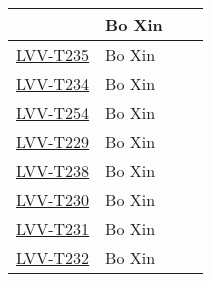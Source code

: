 \documentclass[SE,lsstdraft,STR,toc]{lsstdoc}
\begin{document}
\begin{longtable}{p{3cm}p{3cm}p{3cm}p{6cm}}
& {\small Bo Xin } & {\small  } &
\begin{minipage}[]{6cm}
\smallskip
{\small  }
\medskip
\end{minipage}
\\ \hline
\href{https://jira.lsstcorp.org/secure/Tests.jspa#/testCase/LVV-T235}{LVV-T235}
& {\small Bo Xin } & {\small  } &
\begin{minipage}[]{6cm}
\smallskip
{\small  }
\medskip
\end{minipage}
\\ \hline
\href{https://jira.lsstcorp.org/secure/Tests.jspa#/testCase/LVV-T234}{LVV-T234}
& {\small Bo Xin } & {\small  } &
\begin{minipage}[]{6cm}
\smallskip
{\small  }
\medskip
\end{minipage}
\\ \hline
\href{https://jira.lsstcorp.org/secure/Tests.jspa#/testCase/LVV-T254}{LVV-T254}
& {\small Bo Xin } & {\small  } &
\begin{minipage}[]{6cm}
\smallskip
{\small  }
\medskip
\end{minipage}
\\ \hline
\href{https://jira.lsstcorp.org/secure/Tests.jspa#/testCase/LVV-T229}{LVV-T229}
& {\small Bo Xin } & {\small  } &
\begin{minipage}[]{6cm}
\smallskip
{\small  }
\medskip
\end{minipage}
\\ \hline
\href{https://jira.lsstcorp.org/secure/Tests.jspa#/testCase/LVV-T238}{LVV-T238}
& {\small Bo Xin } & {\small  } &
\begin{minipage}[]{6cm}
\smallskip
{\small  }
\medskip
\end{minipage}
\\ \hline
\href{https://jira.lsstcorp.org/secure/Tests.jspa#/testCase/LVV-T230}{LVV-T230}
& {\small Bo Xin } & {\small  } &
\begin{minipage}[]{6cm}
\smallskip
{\small  }
\medskip
\end{minipage}
\\ \hline
\href{https://jira.lsstcorp.org/secure/Tests.jspa#/testCase/LVV-T231}{LVV-T231}
& {\small Bo Xin } & {\small  } &
\begin{minipage}[]{6cm}
\smallskip
{\small  }
\medskip
\end{minipage}
\\ \hline
\href{https://jira.lsstcorp.org/secure/Tests.jspa#/testCase/LVV-T232}{LVV-T232}
& {\small Bo Xin } & {\small  } &
\begin{minipage}[]{6cm}

\end{minipage}
\end{longtable}
\end{document}
